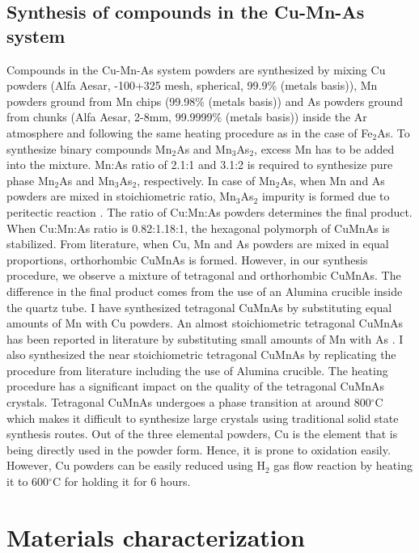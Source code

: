 \documentclass[10pt,doublespacing,edeposit]{uiucthesis2020}
\begin{document}
\begin{mainmatter}
\subsection{Synthesis of compounds in the Cu-Mn-As system}


Compounds in the Cu-Mn-As system powders are synthesized by mixing Cu powders (Alfa Aesar, -100+325 mesh, spherical, 99.9\% (metals basis)), Mn powders ground from Mn chips (99.98\% (metals basis)) and As powders ground from chunks (Alfa Aesar, 2-8mm, 99.9999\% (metals basis)) inside the Ar atmosphere and following the same heating procedure as in the case of Fe$_2$As. To synthesize binary compounds Mn$_2$As and Mn$_3$As$_2$, excess Mn has to be added into the mixture. Mn:As ratio of 2.1:1 and 3.1:2 is required to synthesize pure phase Mn$_2$As and Mn$_3$As$_2$, respectively. In case of Mn$_2$As, when Mn and As powders are mixed in stoichiometric ratio, Mn$_3$As$_2$ impurity is formed due to peritectic reaction \cite{Yuzuri1960}. The ratio of Cu:Mn:As powders determines the final product. When Cu:Mn:As ratio is 0.82:1.18:1, the hexagonal polymorph of CuMnAs is stabilized. From literature, when Cu, Mn and As powders are mixed in equal proportions, orthorhombic CuMnAs is formed. However, in our synthesis procedure, we observe a mixture of tetragonal and orthorhombic CuMnAs. The difference in the final product comes from the use of an Alumina crucible inside the quartz tube. I have synthesized tetragonal CuMnAs by substituting equal amounts of Mn with Cu powders. An almost stoichiometric tetragonal CuMnAs has been reported in literature by substituting small amounts of Mn with As \cite{Uhlirova2019}. I also synthesized the near stoichiometric tetragonal CuMnAs by replicating the procedure from literature including the use of Alumina crucible. The heating procedure has a significant impact on the quality of the tetragonal CuMnAs crystals. Tetragonal CuMnAs undergoes a phase transition at around 800$^\circ$C which makes it difficult to synthesize large crystals using traditional solid state synthesis routes. Out of the three elemental powders, Cu is the element that is being directly used in the powder form. Hence, it is prone to oxidation easily. However, Cu powders can be easily reduced using H$_2$ gas flow reaction by heating it to 600$^\circ$C for holding it for 6 hours.

\section{Materials characterization}


\end{mainmatter}
\end{document}

